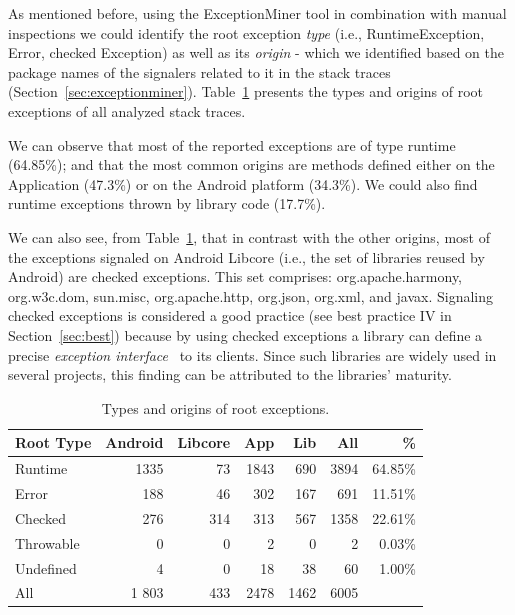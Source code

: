 \documentclass[conference]{IEEEtran}
\begin{document}
As mentioned before, using the ExceptionMiner tool in combination with manual inspections we could identify
the root exception \emph{type} (i.e., RuntimeException, Error, checked Exception) as well as its \emph{origin} - which we 
identified based on the package names of the signalers related to it in the stack traces (Section~\ref{sec:exceptionminer}).
Table~\ref{tab:typeroottab} presents the types and origins of root exceptions of all analyzed stack traces. 

We can observe that most of the reported exceptions are of type runtime 
(64.85\%); and that the most common origins are methods defined either on the Application (47.3\%)
or on the Android platform (34.3\%). We could also find runtime exceptions thrown by library code (17.7\%).
 
We can also see, from Table~\ref{tab:typeroottab}, that in contrast with the other origins, most of the 
 exceptions signaled on Android Libcore (i.e., the set of libraries reused by Android) are 
checked exceptions. This set comprises: org.apache.harmony, org.w3c.dom, sun.misc, 
org.apache.http, org.json, org.xml, and javax. Signaling checked exceptions is considered a 
good practice (see best practice IV in Section~\ref{sec:best}) because by using 
checked exceptions a library can define a precise 
\emph{exception interface}~\cite{miller1997issues} to its clients.
 Since such libraries are widely used  in several projects, this
 finding can be attributed to the libraries' maturity.


\begin{table}
\centering
\begin{tabular}{lrrrrrr}
    \hline
    \bfseries{Root Type} & \bfseries{Android} & \bfseries{Libcore} & \bfseries{App} & \bfseries{Lib}  & \bfseries{All} & \bfseries{\%} \\
    \hline

Runtime	&	1335	&	73	&	1843	&	690  &	3894 & 64.85\% \\  %
Error	       &	 188              &	 46	&	302             &	167	           &	691 & 11.51\%	\\
Checked	&	276           &	314	&	313          &	567	           &	1358 & 22.61\%	\\
Throwable	&	0	       &	0	&	2            &	0         &	2 & 0.03\%	\\
Undefined	&	4	&	0	&	18		&	38	   &	60	& 1.00\% \\
 \hline
All		& 1  803	&	433	&	2478	&	1462	&	6005 	\\
    \hline
  \end{tabular}
\caption{Types and origins of root exceptions.}
  \label{tab:typeroottab}
\end{table}
\end{document}
